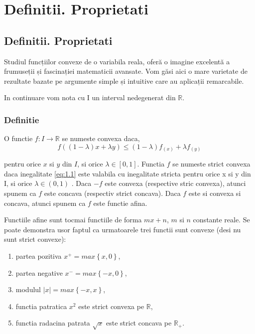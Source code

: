 \documentclass[a4paper,12pt,oneside]{report}
\begin{document}
\maketitle

\tableofcontents

%
%
%
%
\chapter{Definitii. Proprietati}

\section{Definitii. Proprietati}

Studiul funcțiilor convexe de o variabila reala, oferă o imagine excelentă a frumuseții și fascinației matematicii avansate. Vom găsi aici o mare varietate de rezultate bazate pe argumente simple și intuitive care au aplicații remarcabile.

In continuare vom nota cu I un interval nedegenerat din \(\mathbb{R}\).

\subsection{Definitie}

O functie \(f: I \rightarrow \mathbb{R}\) se numeste convexa daca,
\begin{displaymath}
f \left ( \left ( 1 - \lambda  \right )x + \lambda y \right )\leq \left ( 1 - \lambda  \right ) f_{\left ( x \right )} + \lambda f_{\left ( y \right )} 	\label{eq:1.1} \tag{1.1}
\end{displaymath}

pentru orice \(x\) si \(y\) din \(I\), si orice \(\lambda \in \left [ 0,1 \right ]\). Functia \(f\) se numeste strict convexa daca inegalitate \ref{eq:1.1} este valabila cu inegalitate stricta pentru orice x si y din I, si orice  \(\lambda \in \left ( 0,1 \right )\) . Daca \(-f\) este convexa (respective stric convexa), atunci spunem ca \(f\) este concava (respectiv strict concava). Daca \(f\) este si convexa si concava, atunci spunem ca \(f\) este functie afina. 


Functiile afine sunt tocmai functiile de forma \(mx + n\),  \(m\) si \(n\) constante reale.
Se poate demonstra usor faptul ca urmatoarele trei functii sunt convexe (desi nu sunt strict convexe):
\begin{enumerate}
  \item partea pozitiva \(x^{+} = max \left \{ x,0 \right \}\),
  \item partea negative \(x^{-} = max \left \{ -x,0 \right \}\), 
  \item modulul \(\left | x \right | = max \left \{ -x,x \right \}\),
  \item functia patratica \(x^{2}\)  este strict convexa pe \(\mathbb{R}\),
  \item functia radacina patrata \(\sqrt{x}\) este strict concava pe \(\mathbb{R}_{+}\). 
\end{enumerate}
\end{document}
